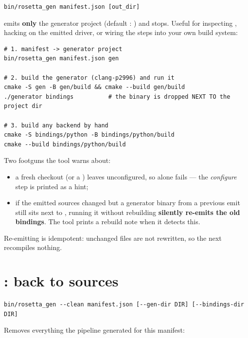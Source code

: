 \begin{lstlisting}[style=sh]
bin/rosetta_gen manifest.json [out_dir]
\end{lstlisting}

emits \textbf{only} the generator project (default :
) and stops. Useful for inspecting
, hacking on the emitted driver, or wiring the steps into your
own build system:

\begin{lstlisting}[style=sh]
# 1. manifest -> generator project
bin/rosetta_gen manifest.json gen

# 2. build the generator (clang-p2996) and run it
cmake -S gen -B gen/build && cmake --build gen/build
./generator bindings          # the binary is dropped NEXT TO the project dir

# 3. build any backend by hand
cmake -S bindings/python -B bindings/python/build
cmake --build bindings/python/build
\end{lstlisting}

Two footguns the tool warns about:

\begin{itemize}
  \item a fresh checkout (or a ) leaves 
    unconfigured, so  alone fails --- the \emph{configure}
    step is printed as a  hint;
  \item if the emitted sources changed but a generator binary from a previous
    emit still sits next to , running it without rebuilding
    \textbf{silently re-emits the old bindings}. The tool prints a rebuild note
    when it detects this.
\end{itemize}

Re-emitting is idempotent: unchanged files are not rewritten, so the next
 recompiles nothing.

\section{: back to sources}

\begin{lstlisting}[style=sh]
bin/rosetta_gen --clean manifest.json [--gen-dir DIR] [--bindings-dir DIR]
\end{lstlisting}

Removes everything the pipeline generated for this manifest:

